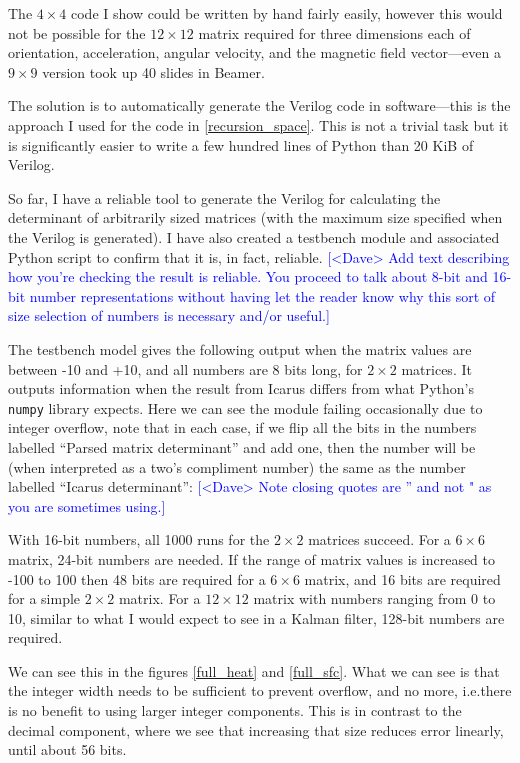 \documentclass[12pt]{article}
\newcommand{\note}[2][red]{\textcolor{#1}{#2}}
\newcommand{\notedme}[1]{\note[blue]{[<Dave> #1]}}
\begin{document}
The $4\times4$ code I show could be written by hand fairly easily, however this would not be possible for the $12\times12$ matrix required for three dimensions each of orientation, acceleration, angular velocity, and the magnetic field vector---even a $9\times9$ version took up 40 slides in Beamer.

The solution is to automatically generate the Verilog code in software---this is the approach I used for the code in \ref{recursion_space}. This is not a trivial task but it is significantly easier to write a few hundred lines of Python than 20 KiB of Verilog.

So far, I have a reliable tool to generate the Verilog for calculating the determinant of arbitrarily sized matrices (with the maximum size specified when the Verilog is generated). I have also created a testbench module and associated Python script to confirm that it is, in fact, reliable.
\notedme{Add text describing how you're checking the result is reliable. You proceed to talk about 8-bit and 16-bit number representations without having let the reader know why this sort of size selection of numbers is necessary and/or useful.}

The testbench model gives the following output when the matrix values are between -10 and +10, and all numbers are 8 bits long, for $2\times2$ matrices. It outputs information when the result from Icarus differs from what Python's \lstinline|numpy| library expects. Here we can see the module failing occasionally due to integer overflow, note that in each case, if we flip all the bits in the numbers labelled ``Parsed matrix determinant'' and add one, then the number will be (when interpreted as a two's compliment number) the same as the number labelled ``Icarus determinant'': \notedme{Note closing quotes are '' and not " as you are sometimes using.}



With 16-bit numbers, all 1000 runs for the $2\times2$ matrices succeed. For a $6\times6$ matrix, 24-bit numbers are needed. If the range of matrix values is increased to -100 to 100 then 48 bits are required for a $6\times6$ matrix, and 16 bits are required for a simple $2\times2$ matrix. For a $12\times12$ matrix with numbers ranging from 0 to 10, similar to what I would expect to see in a Kalman filter, 128-bit numbers are required.

We can see this in the figures \ref{full_heat} and \ref{full_sfc}. What we can see is that the integer width needs to be sufficient to prevent overflow, and no more, i.e.\@ there is no benefit to using larger integer components. This is in contrast to the decimal component, where we see that increasing that size reduces error linearly, until about 56 bits.
\end{document}
